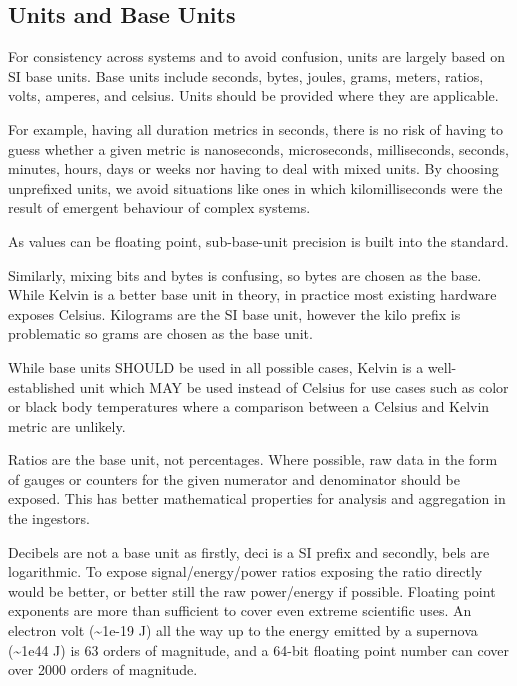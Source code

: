 \documentclass[a4paper,12pt,notitlepage,twoside,openright]{article}
\begin{document}
\hypertarget{units-and-base-units}{%
\subsection{Units and Base Units}\label{units-and-base-units}}

For consistency across systems and to avoid confusion, units are largely
based on SI base units. Base units include seconds, bytes, joules,
grams, meters, ratios, volts, amperes, and celsius. Units should be
provided where they are applicable.

For example, having all duration metrics in seconds, there is no risk of
having to guess whether a given metric is nanoseconds, microseconds,
milliseconds, seconds, minutes, hours, days or weeks nor having to deal
with mixed units. By choosing unprefixed units, we avoid situations like
ones in which kilomilliseconds were the result of emergent behaviour of
complex systems.

As values can be floating point, sub-base-unit precision is built into
the standard.

Similarly, mixing bits and bytes is confusing, so bytes are chosen as
the base. While Kelvin is a better base unit in theory, in practice most
existing hardware exposes Celsius. Kilograms are the SI base unit,
however the kilo prefix is problematic so grams are chosen as the base
unit.

While base units SHOULD be used in all possible cases, Kelvin is a
well-established unit which MAY be used instead of Celsius for use cases
such as color or black body temperatures where a comparison between a
Celsius and Kelvin metric are unlikely.

Ratios are the base unit, not percentages. Where possible, raw data in
the form of gauges or counters for the given numerator and denominator
should be exposed. This has better mathematical properties for analysis
and aggregation in the ingestors.

Decibels are not a base unit as firstly, deci is a SI prefix and
secondly, bels are logarithmic. To expose signal/energy/power ratios
exposing the ratio directly would be better, or better still the raw
power/energy if possible. Floating point exponents are more than
sufficient to cover even extreme scientific uses. An electron volt
(\textasciitilde1e-19 J) all the way up to the energy emitted by a
supernova (\textasciitilde1e44 J) is 63 orders of magnitude, and a
64-bit floating point number can cover over 2000 orders of magnitude.
\end{document}
